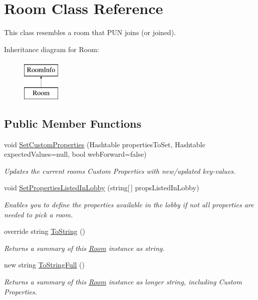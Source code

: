 \hypertarget{class_room}{}\section{Room Class Reference}
\label{class_room}


This class resembles a room that P\+UN joins (or joined).  


Inheritance diagram for Room\+:\begin{figure}[H]
\begin{center}
\leavevmode
\includegraphics[height=2.000000cm]{class_room}
\end{center}
\end{figure}
\subsection*{Public Member Functions}
\begin{DoxyCompactItemize}
\item 
void \hyperlink{class_room_a9f8ac164f4f24be4140221b72792250a}{Set\+Custom\+Properties} (Hashtable properties\+To\+Set, Hashtable expected\+Values=null, bool web\+Forward=false)
\begin{DoxyCompactList}\small\item\em Updates the current room\textquotesingle{}s Custom Properties with new/updated key-\/values. \end{DoxyCompactList}\item 
void \hyperlink{class_room_af3c714b645bb569f4b7f060a985dbf1a}{Set\+Properties\+Listed\+In\+Lobby} (string\mbox{[}$\,$\mbox{]} props\+Listed\+In\+Lobby)
\begin{DoxyCompactList}\small\item\em Enables you to define the properties available in the lobby if not all properties are needed to pick a room. \end{DoxyCompactList}\item 
override string \hyperlink{class_room_ac193e5eddc588b1642b4de892d71082f}{To\+String} ()
\begin{DoxyCompactList}\small\item\em Returns a summary of this \hyperlink{class_room}{Room} instance as string. \end{DoxyCompactList}\item 
new string \hyperlink{class_room_a6f07e076b19abab3c30d2d7ce484538e}{To\+String\+Full} ()
\begin{DoxyCompactList}\small\item\em Returns a summary of this \hyperlink{class_room}{Room} instance as longer string, including Custom Properties. \end{DoxyCompactList}\end{DoxyCompactItemize}
